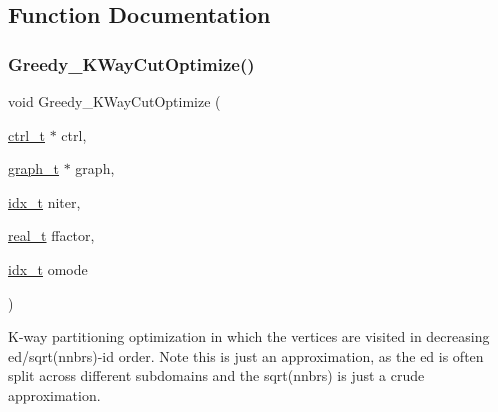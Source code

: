 \subsection{Function Documentation}
\mbox{\label{a00221_aaa70dea85e3a1149132362c93099d543}} 
\subsubsection{\texorpdfstring{Greedy\+\_\+\+K\+Way\+Cut\+Optimize()}{Greedy\_KWayCutOptimize()}}
{\footnotesize\ttfamily void Greedy\+\_\+\+K\+Way\+Cut\+Optimize (\begin{DoxyParamCaption}\item[{\hyperlink{a00742}{ctrl\+\_\+t} $\ast$}]{ctrl,  }\item[{\hyperlink{a00734}{graph\+\_\+t} $\ast$}]{graph,  }\item[{\hyperlink{a00876_aaa5262be3e700770163401acb0150f52}{idx\+\_\+t}}]{niter,  }\item[{\hyperlink{a00876_a1924a4f6907cc3833213aba1f07fcbe9}{real\+\_\+t}}]{ffactor,  }\item[{\hyperlink{a00876_aaa5262be3e700770163401acb0150f52}{idx\+\_\+t}}]{omode }\end{DoxyParamCaption})}

K-\/way partitioning optimization in which the vertices are visited in decreasing ed/sqrt(nnbrs)-\/id order. Note this is just an approximation, as the ed is often split across different subdomains and the sqrt(nnbrs) is just a crude approximation.


